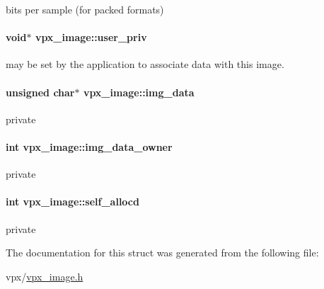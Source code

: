bits per sample (for packed formats) \hypertarget{structvpx__image_a28ae6c046dfca87de4fca4e67cab563d}{
\paragraph[{user\-\_\-priv}]{\setlength{\rightskip}{0pt plus 5cm}void$\ast$ vpx\-\_\-image\-::user\-\_\-priv}}\label{structvpx__image_a28ae6c046dfca87de4fca4e67cab563d}
may be set by the application to associate data with this image. \hypertarget{structvpx__image_a3c9b7a7a68e4a9665b47433a1e96d78b}{
\paragraph[{img\-\_\-data}]{\setlength{\rightskip}{0pt plus 5cm}unsigned char$\ast$ vpx\-\_\-image\-::img\-\_\-data}}\label{structvpx__image_a3c9b7a7a68e4a9665b47433a1e96d78b}
private \hypertarget{structvpx__image_a4d2c8d41b67f7d3f3114212a8d8afdce}{
\paragraph[{img\-\_\-data\-\_\-owner}]{\setlength{\rightskip}{0pt plus 5cm}int vpx\-\_\-image\-::img\-\_\-data\-\_\-owner}}\label{structvpx__image_a4d2c8d41b67f7d3f3114212a8d8afdce}
private \hypertarget{structvpx__image_a33e8c75d8efc5d4f389e8fc09283a4cc}{
\paragraph[{self\-\_\-allocd}]{\setlength{\rightskip}{0pt plus 5cm}int vpx\-\_\-image\-::self\-\_\-allocd}}\label{structvpx__image_a33e8c75d8efc5d4f389e8fc09283a4cc}
private 

The documentation for this struct was generated from the following file\-:\begin{DoxyCompactItemize}
\item 
vpx/\hyperlink{vpx__image_8h}{vpx\-\_\-image.\-h}\end{DoxyCompactItemize}
